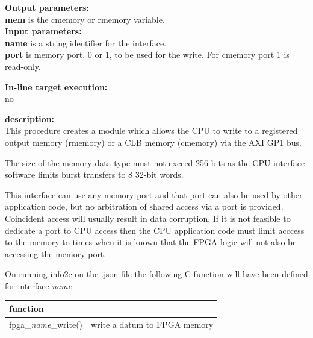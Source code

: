             {\bf Output parameters:} \\
            {\bf mem} is the cmemory or rmemory variable.\\

            {\bf Input parameters:} \\
            {\bf name} is a string identifier for the interface.\\
            {\bf port} is memory port, 0 or 1, to be used for the write. For
            cmemory port 1 is read-only.
        
            {\bf In-line target execution:} \\
            no

            {\bf description:} \\
            This procedure creates a module which allows the CPU to write
            to a registered output memory (rmemory) or a CLB memory (cmemory)
            via the AXI GP1 bus.
            
            The size of the memory data type must not exceed 256 bits as the CPU
            interface software limits burst transfers to 8 32-bit words.
            
            This interface can use any memory port and that port can also be
            used by other application code, but no arbitration of shared access
            via a port is provided. Coincident access will usually result in
            data corruption. If it is not feasible to dedicate a port to CPU
            access then the CPU application code must limit acccess to the
            memory to times when it is known that the FPGA logic will not also
            be accessing the memory port.
            
            On running info2c on the .json file the following C function will have been
            defined for interface {\em name} -
            
            \begin{tabular}{| l | l |}
            \hline
            function                   &                              \\ \hline \hline
            fpga\_{\em name}\_write()  & write a datum to FPGA memory \\ \hline
            \end{tabular}
            
